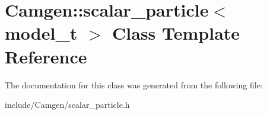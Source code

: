 \hypertarget{a00485}{\section{Camgen\-:\-:scalar\-\_\-particle$<$ model\-\_\-t $>$ Class Template Reference}
\label{a00485}
}


The documentation for this class was generated from the following file\-:\begin{DoxyCompactItemize}
\item 
include/\-Camgen/scalar\-\_\-particle.\-h\end{DoxyCompactItemize}
